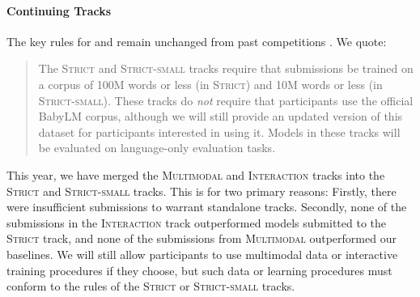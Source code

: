 \documentclass[11pt]{article}
\newcommand{\strict}[1]{\textsc{Strict}}
\newcommand{\strictsmall}[1]{\textsc{Strict-small}}
\newcommand{\vision}[1]{\textsc{Multimodal}}
\newcommand{\interact}[1]{\textsc{Interaction}}
\newcommand{\multilingual}[1]{\textsc{Multilingual}}
\begin{document}
\paragraph{Continuing Tracks} %
The key rules for \textbf{\strict} and \textbf{\strictsmall} remain unchanged from past competitions \citep{choshen2024call, charpentier-etal-2025-findings}.
We quote:
\begin{quote}
    The \strict{} and \strictsmall{} tracks require that submissions be trained on a corpus of 100M words or less (in \strict{}) and 10M words or less (in \strictsmall{}). These tracks do \textit{not} require that participants use the official BabyLM corpus, although we will still provide an updated version of this dataset for participants interested in using it. Models in these tracks will be evaluated on language-only evaluation tasks.

\end{quote}

This year, we have merged the \vision{} and \interact{} tracks into the \strict{} and \strictsmall{} tracks. This is for two primary reasons: Firstly, there were insufficient submissions to warrant standalone tracks.  Secondly, none of the submissions in the \interact{} track outperformed models submitted to the \strict{} track, and none of the submissions from \vision{} outperformed our baselines. We will still allow participants to use multimodal data or interactive training procedures if they choose, but such data or learning procedures must conform to the rules of the \strict{} or \strictsmall{} tracks.
\end{document}
